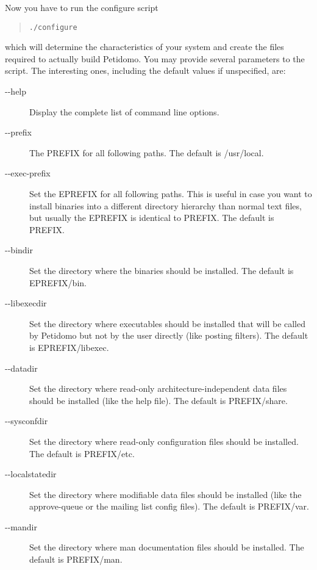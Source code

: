 \documentclass[a4paper,11pt]{scrreprt}
\newcommand{\file}[1]{{\sf #1}}
\begin{document}
Now you have to run the configure script
\begin{quote}
\begin{verbatim}
./configure
\end{verbatim}
\end{quote}
which will determine the characteristics of your system and create the
files required to actually build Petidomo. You may provide several
parameters to the script. The interesting ones, including the default
values if unspecified, are:
\begin{description}

\item[{-}{-}help] Display the complete list of command line options.

\item[{-}{-}prefix] The \file{PREFIX} for all following paths. The
default is \file{/usr/local}.

\item[{-}{-}exec-prefix] Set the \file{EPREFIX} for all following
paths. This is useful in case you want to install binaries into a
different directory hierarchy than normal text files, but usually the
\file{EPREFIX} is identical to \file{PREFIX}. The default is
\file{PREFIX}.

\item[{-}{-}bindir] Set the directory where the binaries should be
installed. The default is \file{EPREFIX/bin}.

\item[{-}{-}libexecdir] Set the directory where executables should be
installed that will be called by Petidomo but not by the user directly
(like posting filters). The default is \file{EPREFIX/libexec}.

\item[{-}{-}datadir] Set the directory where read-only
architecture-independent data files should be installed (like the help
file). The default is \file{PREFIX/share}.

\item[{-}{-}sysconfdir] Set the directory where read-only
configuration files should be installed. The default is
\file{PREFIX/etc}.

\item[{-}{-}localstatedir] Set the directory where modifiable
data files should be installed (like the approve-queue or the mailing
list config files). The default is \file{PREFIX/var}.

\item[{-}{-}mandir] Set the directory where man documentation files
should be installed. The default is \file{PREFIX/man}.

\end{description}
\end{document}
